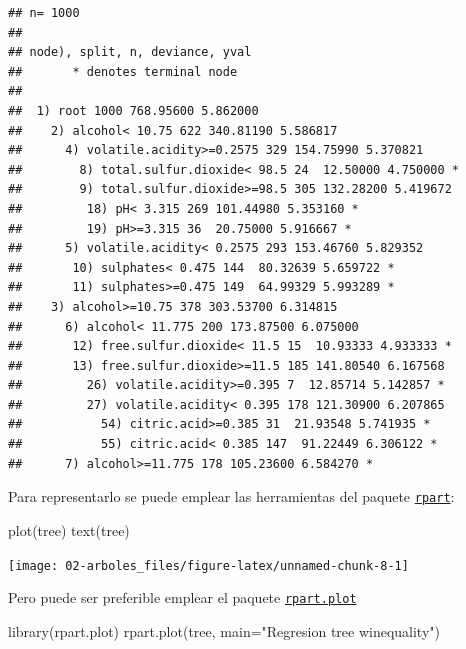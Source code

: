 \documentclass[
]{book}
\newenvironment{Shaded}{\begin{snugshade}}{\end{snugshade}}
\newcommand{\AttributeTok}[1]{\textcolor[rgb]{0.77,0.63,0.00}{#1}}
\newcommand{\FunctionTok}[1]{\textcolor[rgb]{0.00,0.00,0.00}{#1}}
\newcommand{\NormalTok}[1]{#1}
\newcommand{\StringTok}[1]{\textcolor[rgb]{0.31,0.60,0.02}{#1}}
\theoremstyle{break}
\theoremstyle{definition}
\theoremstyle{definition}
\theoremstyle{definition}
\theoremstyle{definition}
\theoremstyle{remark}
\begin{document}
\begin{verbatim}
## n= 1000 
## 
## node), split, n, deviance, yval
##       * denotes terminal node
## 
##  1) root 1000 768.95600 5.862000  
##    2) alcohol< 10.75 622 340.81190 5.586817  
##      4) volatile.acidity>=0.2575 329 154.75990 5.370821  
##        8) total.sulfur.dioxide< 98.5 24  12.50000 4.750000 *
##        9) total.sulfur.dioxide>=98.5 305 132.28200 5.419672  
##         18) pH< 3.315 269 101.44980 5.353160 *
##         19) pH>=3.315 36  20.75000 5.916667 *
##      5) volatile.acidity< 0.2575 293 153.46760 5.829352  
##       10) sulphates< 0.475 144  80.32639 5.659722 *
##       11) sulphates>=0.475 149  64.99329 5.993289 *
##    3) alcohol>=10.75 378 303.53700 6.314815  
##      6) alcohol< 11.775 200 173.87500 6.075000  
##       12) free.sulfur.dioxide< 11.5 15  10.93333 4.933333 *
##       13) free.sulfur.dioxide>=11.5 185 141.80540 6.167568  
##         26) volatile.acidity>=0.395 7  12.85714 5.142857 *
##         27) volatile.acidity< 0.395 178 121.30900 6.207865  
##           54) citric.acid>=0.385 31  21.93548 5.741935 *
##           55) citric.acid< 0.385 147  91.22449 6.306122 *
##      7) alcohol>=11.775 178 105.23600 6.584270 *
\end{verbatim}

Para representarlo se puede emplear las herramientas del paquete \href{https://CRAN.R-project.org/package=rpart}{\texttt{rpart}}:

\begin{Shaded}
\begin{Highlighting}[]
\FunctionTok{plot}\NormalTok{(tree)}
\FunctionTok{text}\NormalTok{(tree)}
\end{Highlighting}
\end{Shaded}

\begin{center}\texttt{[image: 02-arboles\_files/figure-latex/unnamed-chunk-8-1]} \end{center}

Pero puede ser preferible emplear el paquete \href{https://CRAN.R-project.org/package=rpart.plot}{\texttt{rpart.plot}}

\begin{Shaded}
\begin{Highlighting}[]
\FunctionTok{library}\NormalTok{(rpart.plot)}
\FunctionTok{rpart.plot}\NormalTok{(tree, }\AttributeTok{main=}\StringTok{"Regresion tree winequality"}\NormalTok{)  }
\end{Highlighting}
\end{Shaded}
\end{document}
